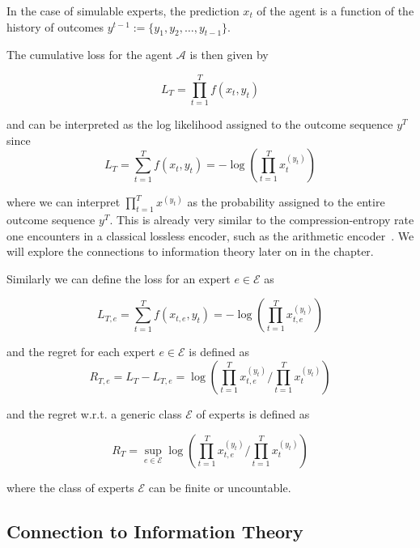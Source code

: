 In the case of simulable experts, the prediction $x_t$ of the agent is a function of the history of outcomes $y^{t-1}:=\{y_1,y_2,\ldots,y_{t-1}\}$.

The cumulative loss for the agent $\mathcal A$ is then given by 

\begin{equation}
L_T=\prod\limits_{t=1}^T f(x_t,y_t)
\end{equation}

and can be interpreted as the log likelihood assigned to the outcome sequence $y^T$ since 
\begin{equation}\label{eq:loss_log}
L_T=\sum\limits_{t=1}^Tf(x_t,y_t)=-\log\left(\prod\limits_{t=1}^Tx_t^{(y_t)}\right)
\end{equation}

where we can interpret $\prod\limits_{t=1}^Tx^{(y_t)}$ as the probability assigned to the entire outcome sequence $y^T$. This is already very similar to the compression-entropy rate one encounters in a classical lossless encoder, such as the arithmetic encoder~\cite{langdon1984introduction}. We will explore the connections to information theory later on in the chapter. 

Similarly we can define the loss for an expert $e\in\mathcal E$ as 

\begin{equation}
L_{T,e}=\sum\limits_{t=1}^Tf(x_{t,e},y_t)=-\log\left(\prod\limits_{t=1}^Tx_{t,e}^{(y_t)}\right)
\end{equation}

and the regret for each expert $e\in\mathcal E$ is defined as 
\begin{equation}
R_{T,e}=L_T-L_{T,e}=\log\left(\prod\limits_{t=1}^Tx_{t,e}^{(y_t)}\bigg/\prod\limits_{t=1}^Tx_t^{(y_t)}\right)
\end{equation}

and the regret w.r.t. a generic class $\mathcal E$ of experts is defined as 

\begin{equation}
R_{T}=\sup\limits_{e\in\mathcal E}\log\left(\prod\limits_{t=1}^Tx_{t,e}^{(y_t)}\bigg/\prod\limits_{t=1}^Tx_t^{(y_t)}\right)
\end{equation}

where the class of experts $\mathcal E$ can be finite or uncountable.

\subsection{Connection to Information Theory}\label{sec:Info} 

